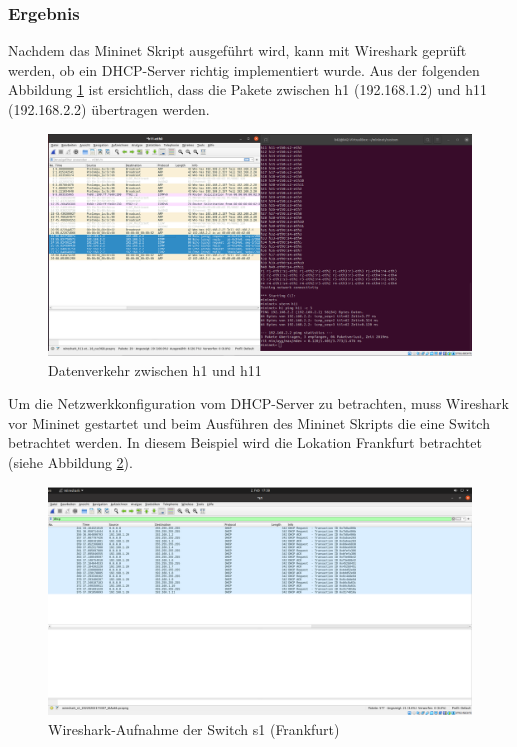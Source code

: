 \documentclass[fontsize=12pt,paper=a4,open=any,parskip=half,
  twoside=false,toc=listof,toc=bibliography,fleqn,leqno,
  captions=nooneline,captions=tableabove,british]{scrbook}
\begin{document}
\subsubsection{Ergebnis}
Nachdem das Mininet Skript ausgeführt wird, kann mit Wireshark geprüft werden, ob ein DHCP-Server richtig implementiert wurde. Aus der folgenden Abbildung \ref{wireshark} ist ersichtlich, dass die Pakete zwischen h1 (192.168.1.2) und h11 (192.168.2.2) übertragen werden.
\begin{figure}[H]
 \centering
 \includegraphics[width=1.0\textwidth]{Bilder/wireshark}
 \captionsetup{justification=centering}
 \caption{Datenverkehr zwischen h1 und h11}
 \label{wireshark}
\end{figure}

Um die Netzwerkkonfiguration vom DHCP-Server zu betrachten, muss Wireshark vor Mininet gestartet und beim Ausführen des Mininet Skripts die eine Switch betrachtet werden. In diesem Beispiel wird die Lokation Frankfurt betrachtet (siehe Abbildung \ref{s1}).

\begin{figure}[H]
 \centering
 \includegraphics[width=1.0\textwidth]{Bilder/s1}
 \captionsetup{justification=centering}
 \caption{Wireshark-Aufnahme der Switch s1 (Frankfurt)}
 \label{s1}
\end{figure}
\end{document}
